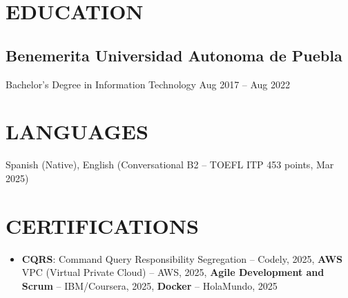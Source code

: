 \documentclass[a4paper,10pt]{article}
\newcommand{\kw}[1]{\textbf{\textcolor{keyword}{#1}}}
\newcommand{\tech}[1]{\textbf{\textcolor{tech}{#1}}}
\begin{document}
\section*{EDUCATION}

\subsection*{Benemerita Universidad Autonoma de Puebla}
Bachelor's Degree in Information Technology \hfill Aug 2017 -- Aug 2022

\section*{LANGUAGES}
Spanish (Native), English (Conversational B2 -- TOEFL ITP 453 points, Mar 2025)

\section*{CERTIFICATIONS}
\begin{itemize}[noitemsep, leftmargin=*]
    \item \kw{CQRS}: Command Query Responsibility Segregation -- Codely, 2025, \tech{AWS} VPC (Virtual Private Cloud) -- AWS, 2025, \kw{Agile Development and Scrum} -- IBM/Coursera, 2025, \tech{Docker} -- HolaMundo, 2025
\end{itemize}
\end{document}
